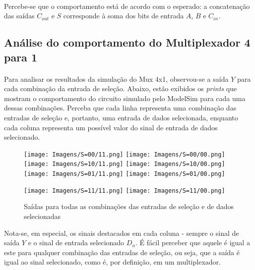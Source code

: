 \documentclass[a4paper,12pt]{article}
\begin{document}
\paragraph{}
Percebe-se que o comportamento está de acordo com o esperado: a concatenação das saídas $C_{out}$ e $S$ corresponde à soma dos bits de entrada $A$, $B$ e $C_{in}$.

\subsection{Análise do comportamento do Multiplexador 4 para 1}

\paragraph{}
Para analisar os resultados da simulação do Mux 4x1, observou-se a saída $Y$ para cada combinação da entrada de seleção. Abaixo, estão exibidos os \textit{prints} que mostram o comportamento do circuito simulado pelo ModelSim para cada uma dessas combinações. Perceba que cada linha representa uma combinação das entradas de seleção e, portanto, uma entrada de dados selecionada, enquanto cada coluna representa um possível valor do sinal de entrada de dados selecionado.

\begin{figure}[H]
    \centering
    \texttt{[image: Imagens/S=00/11.png]}
    \texttt{[image: Imagens/S=00/00.png]} \\
    \texttt{[image: Imagens/S=10/11.png]}
    \texttt{[image: Imagens/S=10/00.png]} \\
    \texttt{[image: Imagens/S=01/11.png]}
    \texttt{[image: Imagens/S=01/00.png]}
\end{figure}
\begin{figure}[H]
    \centering
    \texttt{[image: Imagens/S=11/11.png]}
    \texttt{[image: Imagens/S=11/00.png]}
\caption{Saídas para todas as combinações das entradas de seleção e de dados selecionadas}
\end{figure}

\noindent Nota-se, em especial, os sinais destacados em cada coluna - sempre o sinal de saída $Y$ e o sinal de entrada selecionado $D_{n}$. É fácil perceber que aquele é igual a este para qualquer combinação das entradas de seleção, ou seja, que a saída é igual ao sinal selecionado, como é, por definição, em um multiplexador.
\end{document}
